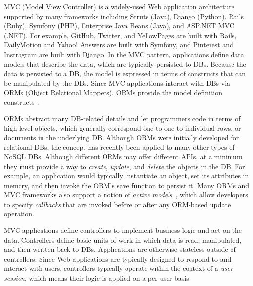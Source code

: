 MVC (Model View Controller) is a widely-used Web application architecture supported by many frameworks including Struts (Java), Django (Python), Rails (Ruby),
Symfony (PHP), Enterprise Java Beans (Java), and ASP.NET MVC (.NET).
For example, GitHub, Twitter, and YellowPages are built with Rails,
DailyMotion and Yahoo! Answers are built with Symfony, and Pinterest
and Instragram are built with Django.
In the MVC pattern, applications define data models that describe the 
data, which are typically
persisted to DBs.  Because the data is persisted to a DB, the 
model is expressed in terms of constructs that can be manipulated by
the DBs.  Since MVC applications interact with DBs via ORMs (Object Relational Mappers), ORMs
provide the model definition constructs~\cite{Barcia:2008aa}.

ORMs abstract many DB-related
details and let programmers code in terms of high-level objects, which
generally correspond one-to-one to individual rows, or documents
in the underlying DB.  Although
ORMs were initially developed for relational DBs, the concept has recently
been applied to many other types of NoSQL DBs.  
Although different ORMs may offer different APIs, at a minimum they must
provide a way to {\em create}, {\em update}, and {\em delete} the objects in
the DB.  For example, an application would typically instantiate an
object, set its attributes in memory, and then invoke the ORM's save
function to persist it.  Many ORMs and MVC frameworks also support a notion of 
{\em active models}~\cite{Fowler:2002:PEA:579257}, which allow
developers to specify {\em callbacks} that are invoked before or after
any ORM-based update operation.  

MVC applications define controllers to implement business logic and
act on the data.  Controllers define basic units of work in which data
is read, manipulated, and then written back to DBs.  Applications are
otherwise stateless outside of controllers.  Since Web applications
are typically designed to respond to and interact with users,
controllers typically operate within the context of a 
{\em user session}, which means their logic is applied on a per user
basis. 

